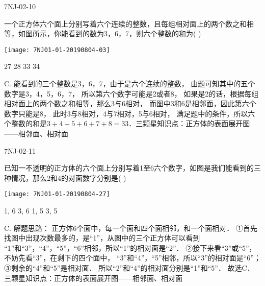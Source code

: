 \begin{defproblem}{7NJ-02-10}%
\begin{onlyproblem}%
一个正方体六个面上分别写着六个连续的整数，且每组相对面上的两个数之和相等，如图所示，你能看到的数为3，6，7，则六个整数的和为(    ) 
\begin{center}
\texttt{[image: 7NJ01-01-20190804-03]}
\end{center}

\xx
{27}
{28}
{33}
{34}

\end{onlyproblem}%
\begin{onlysolution}%
\begin{solution}%
C. 
能看到的三个整数是3，6，7，由于是六个连续的整数， 由题可知其中的五个数字是3，4，5，6，7， 所以第六个数字可能是2或者8， 如果是2的话，根据每组相对面上的两个数之和相等，那么3与6相对， 而图中3和6是相邻面，因此第六个数字只能是8， 此时3与8相对，4与7相对，5与6相对， 满足题中的条件，所以六个整数的和是$3+4+5+6+7+8=33$．三颗星知识点：正方体的表面展开图——相邻面、相对面
\end{solution}%
\end{onlysolution}%
\end{defproblem}




\begin{defproblem}{7NJ-02-11}%
\begin{onlyproblem}%
已知一不透明的正方体的六个面上分别写着1至6六个数字，如图是我们能看到的三种情况，那么2和4的对面数字分别是(    ) 
\begin{center}
\texttt{[image: 7NJ01-01-20190804-27]}
\end{center}

\xx
{1, 6}
{3, 6}
{1, 5}
{3, 5}

\end{onlyproblem}%
\begin{onlysolution}%
\begin{solution}%
C. 
解题思路： 正方体6个面中，每一个面和四个面相邻，和一个面相对． ①首先找图中出现次数最多的，是“1”，从图中的三个正方体可以看到 “1”和“3”，“4”，“5”，“6”相邻，所以“1”的相对面是“2”． ②接下来看“3”或“5”，不妨先看“3”，在剩下的四个面中， “3”和“4”，“5”相邻，所以“3”的相对面是“6”； ③剩余的“4”和“5”是相对面． 所以“2”和“4”的相对面分别是“1”和“5”． 故选C． 
三颗星知识点：正方体的表面展开图——相邻面、相对面  
\end{solution}%
\end{onlysolution}%
\end{defproblem}



